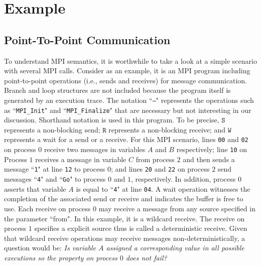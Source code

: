 \section{Example}\label{sec:example}
\subsection{Point-To-Point Communication}
To understand MPI semantics, it is worthwhile to take a look at a simple scenario with several MPI calls. Consider  as an example, it is an MPI program including point-to-point operations (i.e., sends and receives) for message communication. Branch and loop structures are not included because the program itself is generated by an execution trace. The notation ``\texttt{---}" represents the operations such as ``\texttt{MPI\_Init}" and ``\texttt{MPI\_Finalize}" that are necessary but not interesting in our discussion. Shorthand notation is used in this program. To be precise, $\mathtt{S}$ represents a non-blocking send; $\mathtt{R}$ represents a non-blocking receive; and $\mathtt{W}$ represents a wait for a send or a receive. For this MPI scenario, lines \texttt{00} and \texttt{02} on process $0$ receive two messages in variables $A$ and $B$ respectively; line \texttt{10} on Process $1$ receives a message in variable $C$ from process $2$ and then sends a message ``\texttt{1}" at line \texttt{12} to process $0$; and lines \texttt{20} and \texttt{22} on process $2$ send messages ``\texttt{4}" and ``\texttt{Go}" to process $0$ and $1$, respectively. In addition, process $0$ asserts that variable $A$ is equal to ``\texttt{4}" at line \texttt{04}. A wait operation witnesses the completion of the associated send or receive and indicates the buffer is free to use. Each receive on process $0$ may receive a message from any source specified in the parameter ``from". In this example, it is a wildcard receive. The receive on process $1$ specifies a explicit source thus is called a deterministic receive. Given that wildcard receive operations may receive messages non-deterministically, a question would be: \textit{Is variable $A$ assigned a corresponding value in all possible executions so the property on process $0$ does not fail?}

